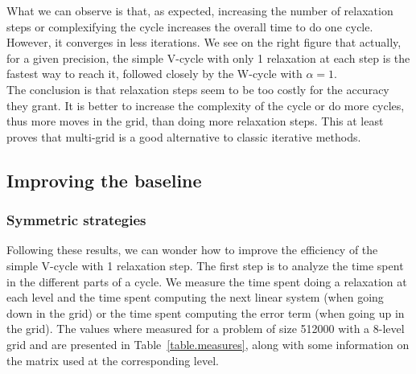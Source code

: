 \documentclass[10pt,conference]{IEEEtran}
\begin{document}
What we can observe is that, as expected, increasing the number of relaxation steps or complexifying the cycle increases the overall time to do one cycle. However, it converges in less iterations.
We see on the right figure that actually, for a given precision, the simple V-cycle with only 1 relaxation at each step is the fastest way to reach it, followed closely by the W-cycle with $\alpha=1$.\\
The conclusion is that relaxation steps seem to be too costly for the accuracy they grant. It is better to increase the complexity of the cycle or do more cycles, thus more moves in the grid, than doing more relaxation steps. This at least proves
that multi-grid is a good alternative to classic iterative methods.

\subsection{Improving the baseline}

\subsubsection{Symmetric strategies}
Following these results, we can wonder how to improve the efficiency of the simple V-cycle with 1 relaxation step.
The first step is to analyze the time spent in the different parts of a cycle. We measure the time spent doing a relaxation at each level and the time spent computing the next linear system
(when going down in the grid) or the time spent computing the error term (when going up in the grid). The values where measured for a problem of size 512000 with a 8-level grid and are presented
in Table~\ref{table.measures}, along with some information on the matrix used at the corresponding level.
\end{document}
